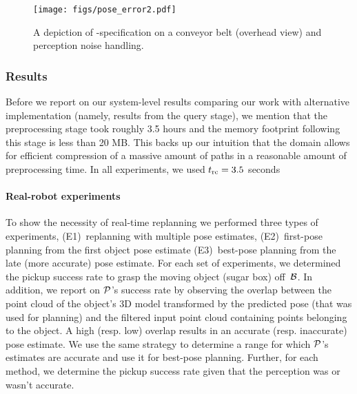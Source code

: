 \documentclass[a4paper,10pt]{article}
\begin{document}
\begin{figure}
    \centering
    \texttt{[image: figs/pose\_error2.pdf]}
    \caption{\CaptionTextSize A depiction of \Gfull-specification on a conveyor belt (overhead view) and perception noise handling. 
    }
    \label{fig:pe}
\end{figure}

\subsubsection{Results}

Before we report on our system-level results comparing our work with alternative implementation (namely, results from the query stage), we mention that the preprocessing stage took roughly 3.5 hours and the memory footprint following this stage is less than 20 MB.
%
This backs up our intuition that the domain allows for efficient compression of a massive amount of paths in a reasonable amount of preprocessing time. In all experiments, we used $t_{\textrm{rc}} =3.5$ seconds




\paragraph{Real-robot experiments}
\label{sec:robot_results}
To show the necessity of real-time replanning we performed three types of experiments, 
(E1)~replanning with multiple pose estimates, 
(E2)~first-pose planning from the first object pose estimate 
(E3)~best-pose planning from the late (more accurate) pose estimate. 
%
For each set of experiments, we determined the pickup success rate to grasp the moving object (sugar box) off~$\mathcal{B}$. In addition, we report on $\mathcal{P}$'s success rate by observing the overlap between the point cloud of the object's 3D model transformed by the predicted pose (that was used for planning) and the filtered input point cloud containing points belonging to the object. 
A high (resp. low) overlap results in an accurate (resp. inaccurate) pose estimate. 
%
We use the same strategy to determine a range for which $\mathcal{P}$'s estimates are accurate and use it for best-pose planning. 
Further, for each method, we determine the pickup success rate given that the perception was or wasn't accurate. 
\end{document}
